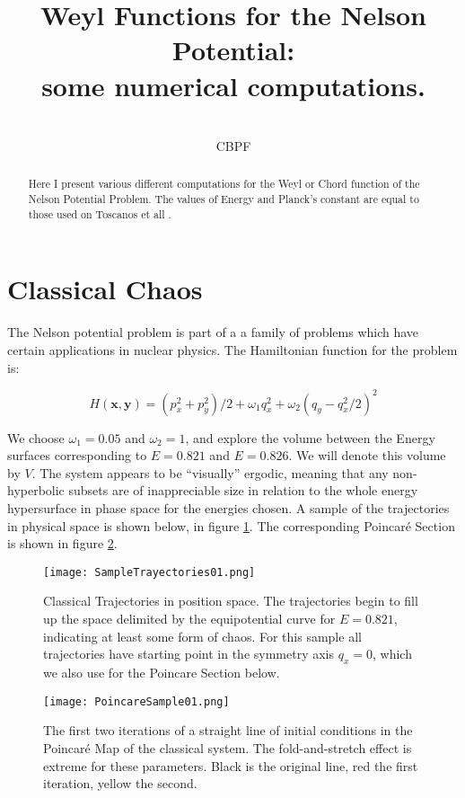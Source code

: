 \documentclass[a4paper,12pt]{article}
\title{ Weyl Functions for the Nelson Potential:\\ some numerical computations.}
\author{\\CBPF}
\newcommand{\xfase}{\mathbf{x}}
\newcommand{\yfase}{\mathbf{y}}
\begin{document}
\maketitle

\begin{abstract}
Here I present various different computations for the Weyl or Chord 
function of the Nelson Potential Problem. The values of Energy
and Planck's constant are equal to  those used on
Toscanos et all \cite{Toscano01}.
\end{abstract}

\section{Classical Chaos}

The Nelson potential problem is part of a a family of problems which
have certain applications in nuclear physics. The Hamiltonian function 
for the problem is:

\begin{equation}
H(\xfase,\yfase)=(p_x^2+p_y^2)/2+\omega_1 q_x^2+
\omega_2(q_y-q_x^2/2)^2
\end{equation}

We choose $\omega_1=0.05$ and $\omega_2=1$, and explore the volume
between the Energy surfaces corresponding to $E=0.821$ 
and $E=0.826$. We will denote this volume by $V$. The system
appears to be ``visually''  ergodic, meaning that any non-hyperbolic
subsets are of inappreciable size in relation to the whole
energy hypersurface in phase space for the energies chosen. 
A sample of the trajectories in physical space is shown below, in
figure \ref{ClassicalTrayec}. The corresponding Poincaré 
Section is shown in figure \ref{ClassicalPoin}. 



\begin{figure}
\begin{center}
  \texttt{[image: SampleTrayectories01.png]}
\caption{Classical Trajectories in position space. The trajectories
begin to fill up the space delimited by the equipotential curve 
for $E=0.821$, indicating at least some form of chaos. For this sample
all trajectories have starting point in the symmetry axis $q_x=0$,
which we also use for the Poincare Section below.}
\label{ClassicalTrayec}
\end{center}
\end{figure}




\begin{figure}
\begin{center}
  \texttt{[image: PoincareSample01.png]}
\caption{The first two iterations of a straight line of initial conditions
in the Poincaré Map of the classical system.  The fold-and-stretch
effect is extreme for these parameters. Black is the original line, red
the first iteration, yellow the second.}
\label{ClassicalPoin}
\end{center}
\end{figure}
\end{document}
